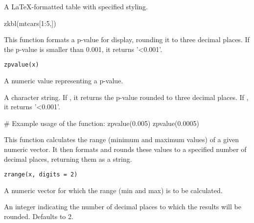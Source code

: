 \documentclass[a4paper]{book}
\begin{document}
%
\begin{Value}
A LaTeX-formatted table with specified styling.
\end{Value}
%
\begin{Examples}
\begin{ExampleCode}
zkbl(mtcars[1:5,])

\end{ExampleCode}
\end{Examples}
%
\begin{Description}
This function formats a p-value for display, rounding it to three decimal places. If the p-value is smaller than 0.001, it returns '<0.001'.
\end{Description}
%
\begin{Usage}
\begin{verbatim}
zpvalue(x)
\end{verbatim}
\end{Usage}
%
\begin{Arguments}
\begin{ldescription}
\item[\code{x}] A numeric value representing a p-value.
\end{ldescription}
\end{Arguments}
%
\begin{Value}
A character string. If , it returns the p-value rounded to three decimal places. If , it returns '<0.001'.
\end{Value}
%
\begin{Examples}
\begin{ExampleCode}
# Example usage of the function:
zpvalue(0.005)
zpvalue(0.0005)

\end{ExampleCode}
\end{Examples}
%
\begin{Description}
This function calculates the range (minimum and maximum values) of a given numeric vector.
It then formats and rounds these values to a specified number of decimal places, returning them as a string.
\end{Description}
%
\begin{Usage}
\begin{verbatim}
zrange(x, digits = 2)
\end{verbatim}
\end{Usage}
%
\begin{Arguments}
\begin{ldescription}
\item[\code{x}] A numeric vector for which the range (min and max) is to be calculated.

\item[\code{digits}] An integer indicating the number of decimal places to which the
results will be rounded. Defaults to 2.
\end{ldescription}
\end{Arguments}
\end{document}

